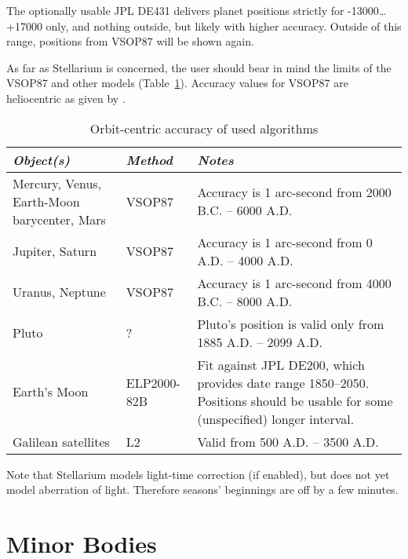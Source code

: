 The optionally usable JPL DE431 delivers planet positions strictly for
-13000\ldots+17000 only, and nothing outside, but likely with higher accuracy. 
Outside of this range, positions from VSOP87 will be shown again.

As far as Stellarium is concerned, the user should bear in mind the
limits of the VSOP87 and other models (Table~\ref{tab:Accuracy:Planets}).
Accuracy values for VSOP87 are heliocentric as given by \citet{1988A&A...202..309B}.

\begin{table}[tb]
\begin{tabularx}{\textwidth}{X|l|X}
\toprule
\emph{Object(s)} & \emph{Method} & \emph{Notes}\tabularnewline
\midrule
Mercury, Venus, Earth-Moon barycenter, Mars & VSOP87 & Accuracy is 1 arc-second from 2000 B.C. -- 6000 A.D. \\%
Jupiter, Saturn                             & VSOP87 & Accuracy is 1 arc-second from 0 A.D. -- 4000 A.D.    \\%
Uranus, Neptune                             & VSOP87 & Accuracy is 1 arc-second from 4000 B.C. -- 8000 A.D. \\%
Pluto                                       & ?      & Pluto's position is valid only from 1885 A.D. -- 2099 A.D.\\%
Earth's Moon                                & ELP2000-82B & Fit against JPL DE200, which provides date range 1850--2050. 
                                                            Positions should be usable for some (unspecified) longer interval. \\%
Galilean satellites                         & L2     & Valid from 500 A.D. -- 3500 A.D.\\ 
\bottomrule
\end{tabularx}
\caption{Orbit-centric accuracy of used algorithms}
\label{tab:Accuracy:Planets}
\end{table}

\noindent Note that Stellarium models light-time correction (if enabled), but does not yet model aberration of light. 
Therefore seasons' beginnings are off by a few minutes.

\section{Minor Bodies}
\label{sec:Accuracy:MinorBodies}


